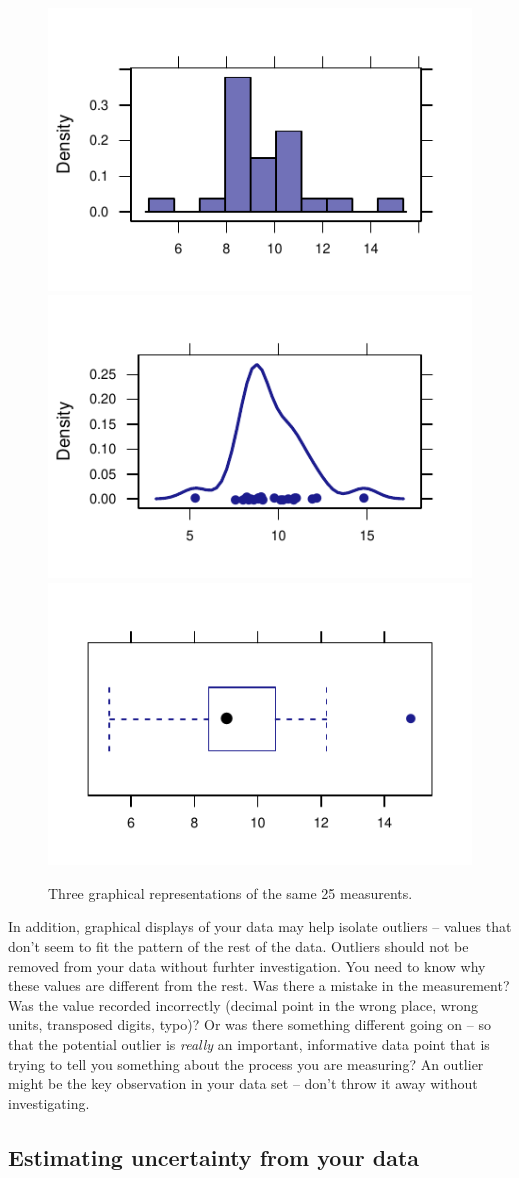 \documentclass[twoside]{book}\usepackage[]{graphicx}\usepackage[]{xcolor}
\newenvironment{knitrout}{}{} %
\begin{document}
\begin{figure}[h]
\begin{knitrout}
\color{fgcolor}

{\centering \includegraphics[width=.3\textwidth]{figures/fig-unnamed-chunk-125-1} 
\includegraphics[width=.3\textwidth]{figures/fig-unnamed-chunk-125-2} 
\includegraphics[width=.3\textwidth]{figures/fig-unnamed-chunk-125-3} 

}



\end{knitrout}
\caption{Three graphical representations of the same 25 measurents.}
\end{figure}


In addition, graphical displays of your data may help isolate outliers -- values
that don't seem to fit the pattern of the rest of the data.  Outliers should not be removed
from your data without furhter investigation.  You need to know why these values are 
different from the rest.  Was there a mistake in the measurement?  Was the value recorded
incorrectly (decimal point in the wrong place, wrong units, transposed digits, typo)?
Or was there something different going on -- so that the potential outlier is \emph{really} an important, informative data point that is trying to tell you something about the process you are measuring?  An outlier might be the key observation in 
your data set -- don't throw it away without investigating.

\subsection{Estimating uncertainty from your data}
\label{sec:uncertainty-from-data}
\end{document}
